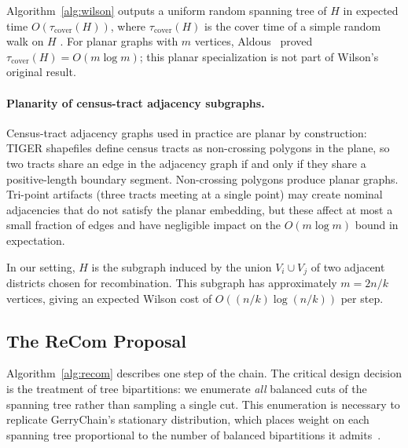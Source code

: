 \begin{theorem}
Algorithm~\ref{alg:wilson} outputs a uniform random spanning tree of $H$
in expected time $O(\tau_{\mathrm{cover}}(H))$, where $\tau_{\mathrm{cover}}(H)$
is the cover time of a simple random walk on $H$ \citep{wilson1996generating}.
For planar graphs with $m$ vertices, Aldous~\citeyearpar{aldous1991random}
proved $\tau_{\mathrm{cover}}(H) = O(m \log m)$; this planar specialization
is not part of Wilson's original result.
\end{theorem}

\paragraph{Planarity of census-tract adjacency subgraphs.}
Census-tract adjacency graphs used in practice are planar by construction:
TIGER shapefiles define census tracts as non-crossing polygons in the plane,
so two tracts share an edge in the adjacency graph if and only if they share
a positive-length boundary segment.
Non-crossing polygons produce planar graphs.
Tri-point artifacts (three tracts meeting at a single point) may create
nominal adjacencies that do not satisfy the planar embedding, but these
affect at most a small fraction of edges and have negligible impact on the
$O(m\log m)$ bound in expectation.

In our setting, $H$ is the subgraph induced by the union $V_i \cup V_j$
of two adjacent districts chosen for recombination.
This subgraph has approximately $m = 2n/k$ vertices, giving an expected
Wilson cost of $O((n/k)\log(n/k))$ per \recom{} step.

\subsection{The ReCom Proposal}

Algorithm~\ref{alg:recom} describes one step of the \recom{} chain.
The critical design decision is the treatment of tree bipartitions:
we enumerate \emph{all} balanced cuts of the spanning tree rather than
sampling a single cut.
This enumeration is necessary to replicate GerryChain's stationary
distribution, which places weight on each spanning tree proportional
to the number of balanced bipartitions it admits~\citep{deford2021recombination}.

